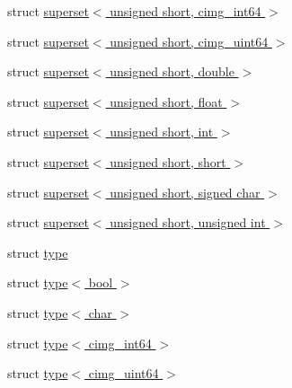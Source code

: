 \begin{DoxyCompactItemize}
\item 
struct \hyperlink{namespacecimg__library__suffixed_1_1cimg_d9/dfe/structcimg__library__suffixed_1_1cimg_1_1superset_3_01unsigned_01short_00_01cimg__int64_01_4}{superset$<$ unsigned short, cimg\+\_\+int64 $>$}
\item 
struct \hyperlink{namespacecimg__library__suffixed_1_1cimg_d9/d9c/structcimg__library__suffixed_1_1cimg_1_1superset_3_01unsigned_01short_00_01cimg__uint64_01_4}{superset$<$ unsigned short, cimg\+\_\+uint64 $>$}
\item 
struct \hyperlink{namespacecimg__library__suffixed_1_1cimg_d0/dbe/structcimg__library__suffixed_1_1cimg_1_1superset_3_01unsigned_01short_00_01double_01_4}{superset$<$ unsigned short, double $>$}
\item 
struct \hyperlink{namespacecimg__library__suffixed_1_1cimg_d7/dff/structcimg__library__suffixed_1_1cimg_1_1superset_3_01unsigned_01short_00_01float_01_4}{superset$<$ unsigned short, float $>$}
\item 
struct \hyperlink{namespacecimg__library__suffixed_1_1cimg_df/dae/structcimg__library__suffixed_1_1cimg_1_1superset_3_01unsigned_01short_00_01int_01_4}{superset$<$ unsigned short, int $>$}
\item 
struct \hyperlink{namespacecimg__library__suffixed_1_1cimg_d1/dc0/structcimg__library__suffixed_1_1cimg_1_1superset_3_01unsigned_01short_00_01short_01_4}{superset$<$ unsigned short, short $>$}
\item 
struct \hyperlink{namespacecimg__library__suffixed_1_1cimg_dc/d0d/structcimg__library__suffixed_1_1cimg_1_1superset_3_01unsigned_01short_00_01signed_01char_01_4}{superset$<$ unsigned short, signed char $>$}
\item 
struct \hyperlink{namespacecimg__library__suffixed_1_1cimg_da/db8/structcimg__library__suffixed_1_1cimg_1_1superset_3_01unsigned_01short_00_01unsigned_01int_01_4}{superset$<$ unsigned short, unsigned int $>$}
\item 
struct \hyperlink{structcimg__library__suffixed_1_1cimg_1_1type}{type}
\item 
struct \hyperlink{structcimg__library__suffixed_1_1cimg_1_1type_3_01bool_01_4}{type$<$ bool $>$}
\item 
struct \hyperlink{structcimg__library__suffixed_1_1cimg_1_1type_3_01char_01_4}{type$<$ char $>$}
\item 
struct \hyperlink{structcimg__library__suffixed_1_1cimg_1_1type_3_01cimg__int64_01_4}{type$<$ cimg\+\_\+int64 $>$}
\item 
struct \hyperlink{structcimg__library__suffixed_1_1cimg_1_1type_3_01cimg__uint64_01_4}{type$<$ cimg\+\_\+uint64 $>$}

\end{DoxyCompactItemize}
